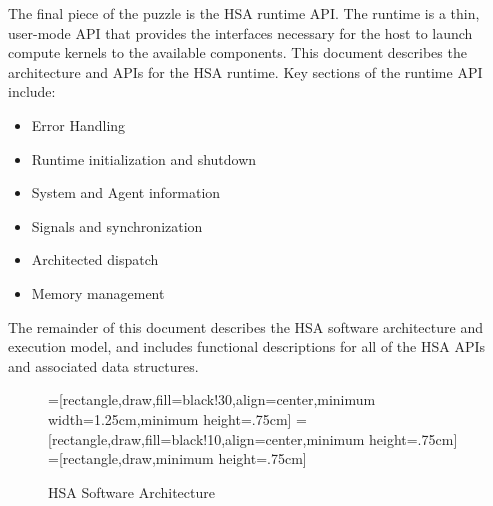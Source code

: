 \documentclass[final,oneside]{book}
\begin{document}
The final piece of the puzzle is the HSA runtime API.  The runtime is a thin,
user-mode API that provides the interfaces necessary for the host to launch
compute kernels to the available components. This document describes the
architecture and APIs for the HSA runtime. Key sections of the runtime API
include:
\begin{itemize}[itemsep=0pt,topsep=0pt,partopsep=0pt]
\item Error Handling
\item Runtime initialization and shutdown
\item System and Agent information
\item Signals and synchronization
\item Architected dispatch
\item Memory management
\end{itemize}

The remainder of this document describes the HSA software architecture and
execution model, and includes functional descriptions for all of the HSA APIs
and associated data structures.

\begin{figure}[t]
  \centering
  =[rectangle,draw,fill=black!30,align=center,minimum width=1.25cm,minimum height=.75cm]
  =[rectangle,draw,fill=black!10,align=center,minimum height=.75cm]
  =[rectangle,draw,minimum height=.75cm]
  \caption{HSA Software Architecture}
  \label{fig:swarch}
\end{figure}
\end{document}
